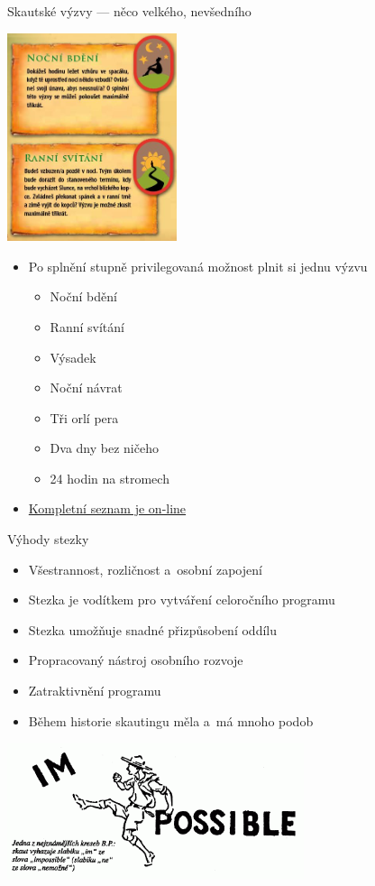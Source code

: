 \documentclass[compress, ucs, xelatex, xcolor=dvipsnames, print,
  hyperref={
    bookmarks=true,
    unicode=true,
    colorlinks=true,
    plainpages=false,
    pdfkeywords={Skaut, Junak, Skauting, Vychovna metoda},
    linkcolor=Black,
    anchorcolor=Black,
    citecolor=OliveGreen,
    filecolor=OliveGreen,
    menucolor=Black,
    urlcolor=OliveGreen,
    pdftex}
  ]{beamer}
\begin{document}
\begin{frame}{Skautské výzvy --- něco velkého, nevšedního}
  \begin{multicols}{2}
    \includegraphics[height=6.1cm]{vyzvy.png}
    \begin{itemize}
      \item Po splnění stupně privilegovaná možnost plnit si jednu výzvu
      \begin{itemize}
	\item Noční bdění
	\item Ranní svítání
	\item Výsadek
	\item Noční návrat
	\item Tři orlí pera
	\item Dva dny bez ničeho
	\item 24 hodin na stromech
      \end{itemize}
      \item \href{https://krizovatka.skaut.cz/oddil/program/dle-vychovnych-kategorii/skauti-skautky/skauti-skautky-stezky/skauti-skautky-stezky-vyzvy}{Kompletní seznam je on-line}
    \end{itemize}
  \end{multicols}
\end{frame}

\begin{frame}{Výhody stezky}
  \begin{itemize}
    \item Všestrannost, rozličnost a~osobní zapojení
    \item Stezka je vodítkem pro vytváření celoročního programu
    \item Stezka umožňuje snadné přizpůsobení oddílu
    \item Propracovaný nástroj osobního rozvoje
    \item Zatraktivnění programu
    \item Během historie skautingu měla a~má mnoho podob
  \end{itemize}
  \begin{center}
    \includegraphics[height=4cm]{im-possible_m.png}
  \end{center}
\end{frame}
\end{document}
